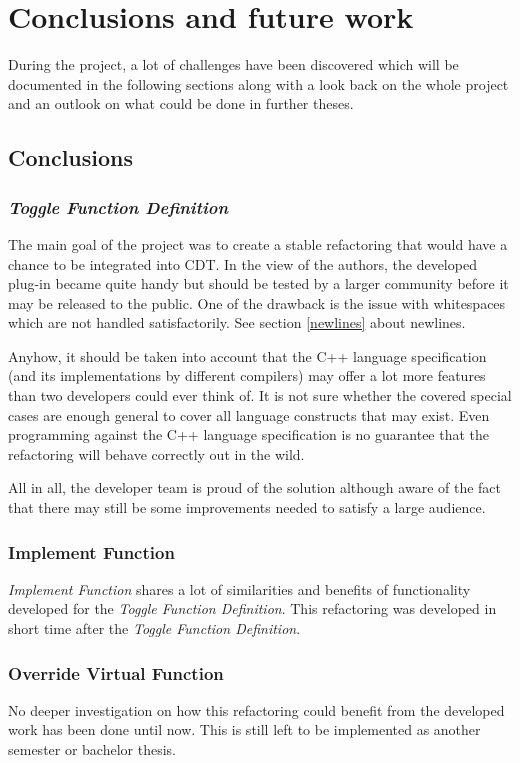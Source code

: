 \chapter{Conclusions and future work}
\thispagestyle{fancy}

During the project, a lot of challenges have been discovered which will be 
documented in the following sections along with a look back on the whole project 
and an outlook on what could be done in further theses. 

\section{Conclusions}

\subsection{\textit{Toggle Function Definition}}
The main goal of the project was to create a stable refactoring that would have 
a chance to be integrated into CDT. In the view of the authors, the developed 
plug-in became quite handy but should be tested by a larger community before it 
may be released to the public. One of the drawback is the issue with
whitespaces which are not handled satisfactorily. See section \ref{newlines}
about newlines.

Anyhow, it should be taken into account that the C++ language specification (and 
its implementations by different compilers) may offer a lot more features 
than two developers could ever think of. It is not sure whether the covered
special cases are enough general to cover all language constructs that may
exist. Even programming against the C++ language specification is no guarantee
that the refactoring will behave correctly out in the wild.

All in all, the developer team is proud of the solution although aware of the 
fact that there may still be some improvements needed to satisfy a large 
audience.

\subsection{Implement Function}
\textit{Implement Function} shares a lot of similarities and benefits of
functionality developed for the \textit{Toggle Function Definition}. This
refactoring was developed in short time after the \textit{Toggle Function
Definition}.

\subsection{Override Virtual Function}
No deeper investigation on how this refactoring could benefit from the developed 
work has been done until now. This is still left to be implemented as another
semester or bachelor thesis.

